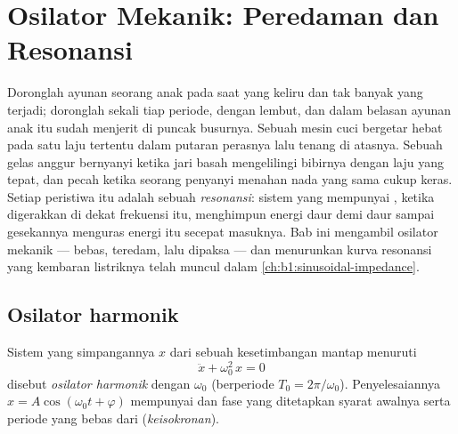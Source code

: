 \chapter{Osilator Mekanik: Peredaman dan Resonansi}\label{ch:b1:oscillators-resonance}

Doronglah ayunan seorang anak pada saat yang keliru dan tak banyak yang
terjadi; doronglah sekali tiap periode, dengan lembut, dan dalam belasan
ayunan anak itu sudah menjerit di puncak busurnya. Sebuah mesin cuci
bergetar hebat pada satu laju tertentu dalam putaran perasnya lalu
tenang di atasnya. Sebuah gelas anggur bernyanyi ketika jari basah
mengelilingi bibirnya dengan laju yang tepat, dan pecah ketika seorang
penyanyi menahan nada yang sama cukup keras. Setiap peristiwa itu adalah
sebuah \emph{resonansi}: sistem yang mempunyai , ketika
digerakkan di dekat frekuensi itu, menghimpun energi daur demi daur
sampai gesekannya menguras energi itu secepat masuknya. Bab ini
mengambil osilator mekanik --- bebas, teredam, lalu dipaksa --- dan
menurunkan kurva resonansi yang kembaran listriknya telah muncul dalam
\cref{ch:b1:sinusoidal-impedance}.

\section{Osilator harmonik}

\begin{definition}\label{def:b1:oscillators-resonance:harmonic}
Sistem yang simpangannya $x$ dari sebuah kesetimbangan mantap menuruti
\[
\ddot x + \omega_0^2\,x = 0
\]
disebut \emph{osilator harmonik} dengan \emph{}
$\omega_0$ (berperiode $T_0 = 2\pi/\omega_0$). Penyelesaiannya $x = A\cos(\omega_0t
+ \varphi)$ mempunyai  dan fase yang ditetapkan syarat awalnya
serta periode yang bebas dari  (\emph{keisokronan}).
\end{definition}

